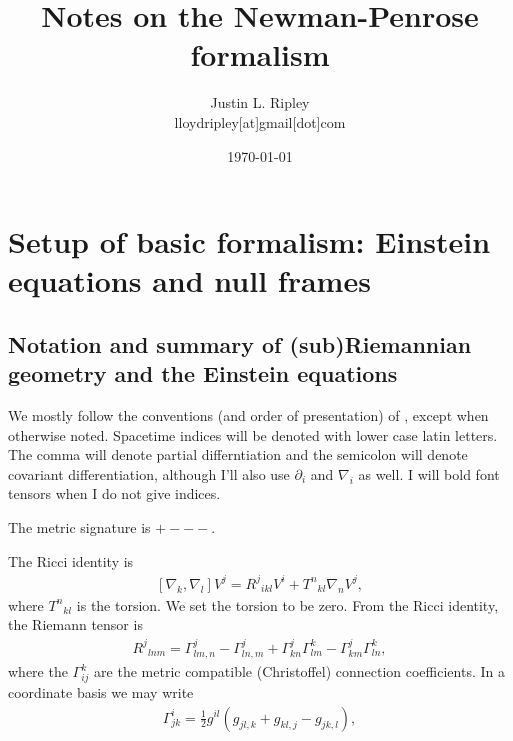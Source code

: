 \documentclass[12pt]{report}
\begin{document}
\title{
{Notes on the Newman-Penrose formalism}\\
}
\author{Justin L. Ripley 
   \\ \small{lloydripley[at]gmail[dot]com}
   }
\date{\today}

\maketitle



\tableofcontents

\chapter{Setup of basic formalism: Einstein equations and null frames}
\label{chptr:NP_formalism}
\section{Notation and summary of (sub)Riemannian geometry and the
Einstein equations}
\label{sec:notation}
	We mostly follow the conventions (and order of presentation) of
\cite{Chandrasekhar_bh_book}, except when otherwise noted.
Spacetime indices will be denoted with
lower case latin letters. The comma will denote
partial differntiation and the semicolon will denote covariant differentiation,
although I'll also use $\partial_i$ and $\nabla_i$ as well. I will bold font
tensors when I do not give indices.

	The metric signature is $+---$.

	The Ricci identity is
\begin{align}
	\left[\nabla_k,\nabla_l\right]V^j
	=	
	R^j{}_{ikl}V^i
+
	T^n{}_{kl}\nabla_nV^j
	,
\end{align}
	where $T^n{}_{kl}$ is the torsion. We set the torsion to be zero.
	From the Ricci identity, the Riemann tensor is
\begin{align}
	R^j{}_{lnm}
	=
	\Gamma^j_{lm,n}
-	\Gamma^j_{ln,m}
+	\Gamma^j_{kn}\Gamma^k_{lm}
-	\Gamma^j_{km}\Gamma^k_{ln}
	,
\end{align}
	where the $\Gamma^k_{ij}$ are the metric compatible (Christoffel)
connection coefficients. In a coordinate basis we may write 
\begin{align}
	\Gamma^i_{jk}
	=
	\frac{1}{2}g^{il}\left(
		g_{jl,k}
	+	g_{kl,j}
	-	g_{jk,l}
	\right)
	,
\end{align}
\end{document}
